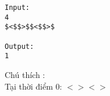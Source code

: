 \begin{verbatim}
Input:
4
$<$$>$$<$$>$

Output:
1
\end{verbatim}  Chú thích :  
\\  Tại thời điểm 0: $<$$>$$<$$>$  
\\